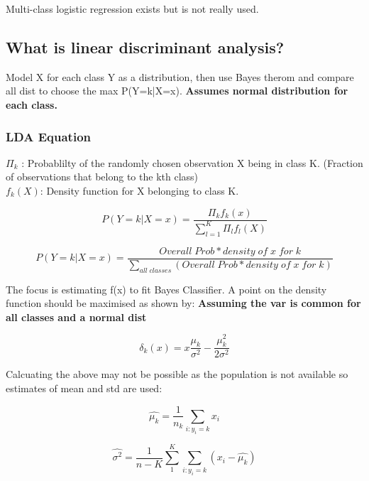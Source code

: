\documentclass[11pt]{scrartcl} %
\begin{document}
Multi-class logistic regression exists but is not really used.

\subsection{What is linear discriminant analysis?}

Model X for each class Y as a distribution, then use Bayes therom and compare all dist to choose the max P(Y=k|X=x).
\textbf{Assumes normal distribution for each class.}

\subsubsection{LDA Equation}

\(\Pi_k\) : Probablilty of the randomly chosen observation X being in class K. (Fraction of observations that belong to the kth class)\\

\(f_k(X)\): Density function for X belonging to class K.

\begin{equation}
	P(Y=k|X=x) = \frac{\Pi_kf_k(x)}{\sum^K_{l=1}{\Pi_lf_l(X)}}
\end{equation}

\begin{equation}
	P(Y=k|X=x) = \frac{Overall\; Prob * density\; of \; x \; for \; k}{\sum_{all\; classes}(Overall\; Prob * density\; of \; x \; for \; k)}
\end{equation}

The focus is estimating f(x) to fit Bayes Classifier. A point on the density function should be maximised as shown by:
\textbf{Assuming the var is common for all classes and a normal dist}

\begin{equation}
	\delta_k(x) = x\frac{\mu_k}{\sigma^2} - \frac{\mu_k^2}{2\sigma^2}
\end{equation}

Calcuating the above may not be possible as the population is not available so estimates of mean and std are used:

\begin{equation}
	\hat{\mu_k} = \frac{1}{n_k}\sum_{i:y_i=k}{x_i}
\end{equation}


\begin{equation}
	\hat{\sigma^2}  = \frac{1}{n-K}\sum^K_1\sum_{i:y_i=k}(x_i - \hat{\mu_k})
\end{equation}
\end{document}
